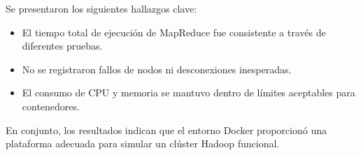 Se presentaron los siguientes hallazgos clave:

\begin{itemize}
    \item El tiempo total de ejecuci\'on de MapReduce fue consistente a trav\'es de diferentes pruebas.
    \item No se registraron fallos de nodos ni desconexiones inesperadas.
    \item El consumo de CPU y memoria se mantuvo dentro de l\'imites aceptables para contenedores.
\end{itemize}

En conjunto, los resultados indican que el entorno Docker proporcion\'o una plataforma adecuada para simular un cl\'uster Hadoop funcional.
